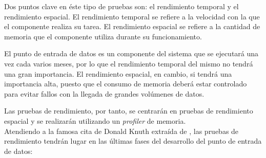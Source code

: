 Dos puntos clave en éste tipo de pruebas son: el rendimiento temporal y el rendimiento espacial.  El rendimiento temporal se refiere a la velocidad con la que el componente realiza su tarea.  El rendimiento espacial se refiere a la cantidad de memoria que el componente utiliza durante su funcionamiento.

El punto de entrada de datos es un componente del sistema que se ejecutará una vez cada varios meses, por lo que el rendimiento temporal del mismo no tendrá una gran importancia.  El rendimiento espacial, en cambio, si tendrá una importancia alta, puesto que el consumo de memoria deberá estar controlado para evitar fallos con la llegada de grandes volúmenes de datos.

Las pruebas de rendimiento, por tanto, se centrarán en pruebas de rendimiento espacial y se realizarán utilizando un \textit{profiler} de memoria.\\
Atendiendo a la famosa cita de Donald Knuth extraída de \cite{knuth:structuredprogramming}, las pruebas de rendimiento tendrán lugar en las últimas fases del desarrollo del punto de entrada de datos:  


